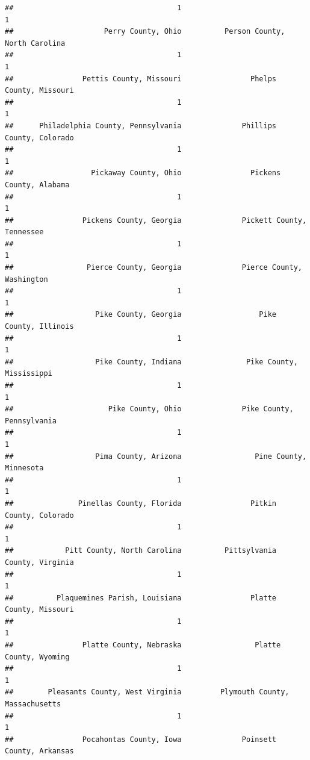 \documentclass[
]{article}
\begin{document}
\begin{verbatim}
##                                      1                                      1 
##                     Perry County, Ohio          Person County, North Carolina 
##                                      1                                      1 
##                Pettis County, Missouri                Phelps County, Missouri 
##                                      1                                      1 
##      Philadelphia County, Pennsylvania              Phillips County, Colorado 
##                                      1                                      1 
##                  Pickaway County, Ohio                Pickens County, Alabama 
##                                      1                                      1 
##                Pickens County, Georgia              Pickett County, Tennessee 
##                                      1                                      1 
##                 Pierce County, Georgia              Pierce County, Washington 
##                                      1                                      1 
##                   Pike County, Georgia                  Pike County, Illinois 
##                                      1                                      1 
##                   Pike County, Indiana               Pike County, Mississippi 
##                                      1                                      1 
##                      Pike County, Ohio              Pike County, Pennsylvania 
##                                      1                                      1 
##                   Pima County, Arizona                 Pine County, Minnesota 
##                                      1                                      1 
##               Pinellas County, Florida                Pitkin County, Colorado 
##                                      1                                      1 
##            Pitt County, North Carolina          Pittsylvania County, Virginia 
##                                      1                                      1 
##          Plaquemines Parish, Louisiana                Platte County, Missouri 
##                                      1                                      1 
##                Platte County, Nebraska                 Platte County, Wyoming 
##                                      1                                      1 
##        Pleasants County, West Virginia         Plymouth County, Massachusetts 
##                                      1                                      1 
##                Pocahontas County, Iowa              Poinsett County, Arkansas 

\end{verbatim}
\end{document}
